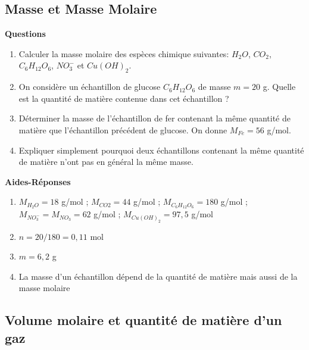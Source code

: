 \documentclass[
]{book}
\providecommand{\tightlist}{%
  \setlength{\itemsep}{0pt}\setlength{\parskip}{0pt}}
\def\tightlist{}
\begin{document}
\hypertarget{masse-et-masse-molaire}{%
\subsection{Masse et Masse Molaire}\label{masse-et-masse-molaire}}

\begin{blackbox}

\begin{center}
\textbf{Questions}

\end{center}

\begin{enumerate}
\def\labelenumi{\arabic{enumi}.}
\tightlist
\item
  Calculer la masse molaire des espèces chimique suivantes: \(H_2O\), \(CO_2\), \(C_6H_{12}O_6\), \(NO_3^{-}\) et \(Cu(OH)_2\).
\item
  On considère un échantillon de glucose \(C_6H_{12}O_6\) de masse \(m=20\) g. Quelle est la quantité de matière contenue dans cet échantillon ?
\item
  Déterminer la masse de l'échantillon de fer contenant la même quantité de matière que l'échantillon précédent de glucose. On donne \(M_{Fe}=56\) g/mol.
\item
  Expliquer simplement pourquoi deux échantillons contenant la même quantité de matière n'ont pas en général la même masse.
\end{enumerate}

\end{blackbox}

\textbf{Aides-Réponses}

\begin{enumerate}
\def\labelenumi{\arabic{enumi}.}
\tightlist
\item
  \(M_{H_2O}=18\) g/mol ; \(M_{CO2}=44\) g/mol ; \(M_{C_6H_{12}O_6}=180\) g/mol ; \(M_{NO_3^-}=M_{NO_3}=62\) g/mol ; \(M_{Cu(OH)_2}=97,5\) g/mol
\item
  \(n=20/180 =0,11\) mol
\item
  \(m=6,2\) g
\item
  La masse d'un échantillon dépend de la quantité de matière mais aussi de la masse molaire
\end{enumerate}

\hypertarget{volume-molaire-et-quantituxe9-de-matiuxe8re-dun-gaz}{%
\subsection{Volume molaire et quantité de matière d'un gaz}\label{volume-molaire-et-quantituxe9-de-matiuxe8re-dun-gaz}}
\end{document}
